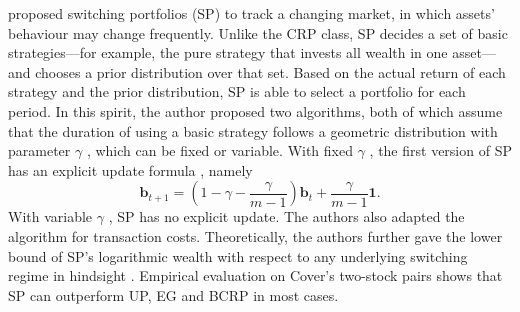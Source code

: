 \citet{singer97} proposed switching portfolios (SP) to track a changing market, in which assets' behaviour may change frequently. Unlike the CRP class, SP decides a set of basic strategies---for example, the pure strategy that invests all wealth in one asset---and chooses a prior distribution over that set. Based on the actual return of each strategy and the prior distribution, SP is able to select a portfolio for each period. In this spirit, the author proposed two algorithms, both of which assume that the duration of using a basic strategy follows a geometric distribution with parameter $\gamma$ , which can be fixed or variable. With fixed $\gamma$ , the first version of SP has an explicit update formula \citep[Eq.~(6)]{singer97}, namely
\begin{equation}
	\mathbf{b}_{t+1}
	= \left(1 - \gamma - \frac{\gamma}{m-1}\right)\mathbf{b}_t + \frac{\gamma}{m-1}\mathbf{1}.
\end{equation}
With variable $\gamma$ , SP has no explicit update. The authors also adapted the algorithm for transaction costs. Theoretically, the authors further gave the lower bound of SP's logarithmic wealth with respect to any underlying switching regime in hindsight \citep[Theorem~2]{singer97}. Empirical evaluation on Cover's two-stock pairs shows that SP can outperform UP, EG and BCRP in most cases.
%
%
%
%
%
%
%
%
%
%
%
%
%

